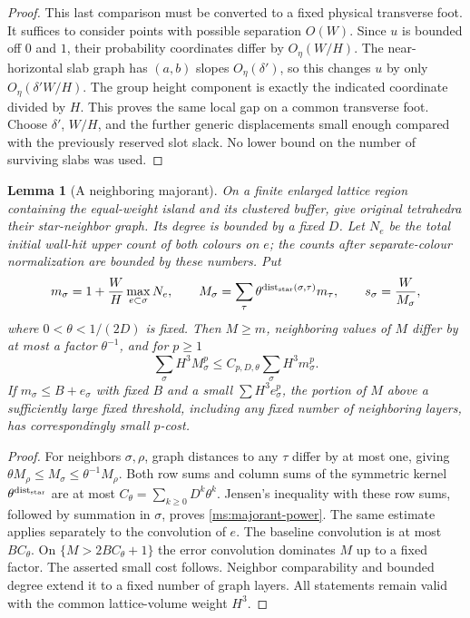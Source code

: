 \documentclass[11pt]{article}
\numberwithin{equation}{section}
\newtheorem{lemma}[theorem]{Lemma}
\theoremstyle{definition}
\theoremstyle{remark}
\begin{document}
\begin{proof}
This last comparison must be converted to a fixed physical
transverse foot.  It suffices to consider points with possible
separation $O(W)$.  Since $u$ is bounded off $0$ and $1$, their
probability coordinates differ by $O_\eta(W/H)$.  The near-horizontal
slab graph has $(a,b)$ slopes $O_\eta(\delta')$, so this changes
$u$ by only $O_\eta(\delta'W/H)$.  The group height component is
exactly the indicated coordinate divided by $H$.  This proves the
same local gap on a common transverse foot.  Choose $\delta'$,
$W/H$, and the further generic displacements small enough compared
with the previously reserved slot slack.  No lower bound on the
number of surviving slabs was used.
\end{proof}

\begin{lemma}[A neighboring majorant]
\label{ms:majorant}
On a finite enlarged lattice region containing the equal-weight
island and its clustered buffer, give original tetrahedra their
star-neighbor graph.  Its degree is bounded by a fixed $D$.
Let $N_e$ be the total initial wall-hit upper count of both colours on
$e$; the counts after separate-colour normalization are bounded by
these numbers.  Put
\begin{equation}
 m_\sigma=1+\frac WH\max_{e\subset\sigma}N_e,
 \qquad
 M_\sigma=\sum_\tau
       \theta^{\operatorname{dist}_{\rm star}(\sigma,\tau)}m_\tau,
 \qquad
 s_\sigma=\frac W{M_\sigma},
 \label{ms:majorant-def}
\end{equation}
where $0<\theta<1/(2D)$ is fixed.  Then $M\ge m$,
neighboring values of $M$ differ by at most a factor $\theta^{-1}$,
and for $p\ge1$
\begin{equation}
 \sum_\sigma H^3M_\sigma^p
       \le C_{p,D,\theta}\sum_\sigma H^3m_\sigma^p.
 \label{ms:majorant-power}
\end{equation}
If $m_\sigma\le B+e_\sigma$ with fixed $B$ and a small
$\sum H^3e_\sigma^p$, the portion of $M$ above a sufficiently large
fixed threshold, including any fixed number of neighboring layers,
has correspondingly small $p$-cost.
\end{lemma}

\begin{proof}
For neighbors $\sigma,\rho$, graph distances to any $\tau$ differ
by at most one, giving
$\theta M_\rho\le M_\sigma\le\theta^{-1}M_\rho$.
Both row sums and column sums of the symmetric kernel
$\theta^{\operatorname{dist}_{\rm star}}$ are at most
$C_\theta=\sum_{k\ge0}D^k\theta^k$.  Jensen's inequality with
these row sums, followed by summation in $\sigma$, proves
\eqref{ms:majorant-power}.  The same estimate applies separately
to the convolution of $e$.  The baseline convolution is at most
$BC_\theta$.  On $\{M>2BC_\theta+1\}$ the error convolution
dominates $M$ up to a fixed factor.  The asserted small cost follows.
Neighbor comparability and bounded degree extend it to a fixed
number of graph layers.  All statements remain valid with the
common lattice-volume weight $H^3$.
\end{proof}
\end{document}
